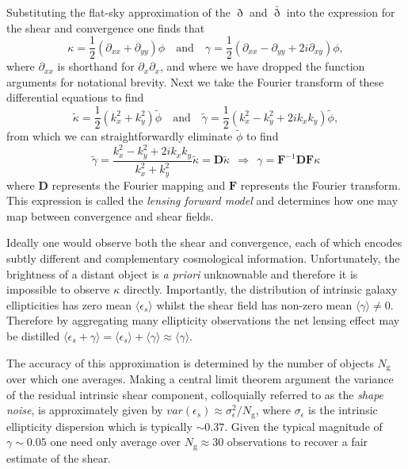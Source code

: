 \documentclass[fleqn,usenatbib]{mnras}
\begin{document}
Substituting the flat-sky approximation of the $\eth$ and $\bar{\eth}$ into the expression for the shear and convergence one finds that 
\begin{equation}
	\kappa = \frac{1}{2}(\partial_{xx}+\partial_{yy}) \phi
	\quad \text{and} \quad 
	\gamma = \frac{1}{2}(\partial_{xx}-\partial_{yy}+2i\partial_{xy})\phi,
\end{equation}
where $\partial_{xx}$ is shorthand for $\partial_x\partial_x$, and where we have dropped the function arguments for notational brevity. Next we take the Fourier transform of these differential equations to find 
\begin{equation}
	\tilde{\kappa} = \frac{1}{2}(k_x^2+k_y^2) \tilde{\phi}
	\quad \text{and} \quad 
	\tilde{\gamma} = \frac{1}{2}(k_x^2-k_y^2+2ik_xk_y)\tilde{\phi},
\end{equation}
from which we can straightforwardly eliminate $\tilde{\phi}$ to find 
\begin{equation} \label{eq:lensing_inv_problem}
	\tilde{\gamma} = \frac{k_x^2 - k_y^2 + 2ik_xk_y}{k_x^2+k_y^2}\tilde{\kappa} = \mathbf{D}\tilde{\kappa} 
	\:\: \Rightarrow \: \:  \gamma = \mathbf{F}^{-1}\mathbf{DF}\kappa
\end{equation}
where $\mathbf{D}$ represents the Fourier mapping and $\mathbf{F}$ represents the Fourier transform. This expression is called the \emph{lensing forward model} and determines how one may map between convergence and shear fields. 

Ideally one would observe both the shear and convergence, each of which encodes subtly different and complementary cosmological information. Unfortunately, the brightness of a distant object is \emph{a priori} unknownable and therefore it is impossible to observe $\kappa$ directly. Importantly, the distribution of intrinsic galaxy ellipticities has zero mean $\langle \epsilon_s \rangle$ whilst the shear field has non-zero mean $\langle \gamma \rangle \not= 0$. Therefore by aggregating many ellipticity observations the net lensing effect may be distilled $\langle \epsilon_s + \gamma \rangle = \langle \epsilon_s \rangle + \langle \gamma \rangle \approx \langle \gamma \rangle$. 

The accuracy of this approximation is determined by the number of objects $N_\text{g}$ over which one averages. Making a central limit theorem argument the variance of the residual intrinsic shear component, colloquially referred to as the \emph{shape noise}, is approximately given by $var(\epsilon_s) \approx \sigma^2_\epsilon / N_\text{g}$, where $\sigma_\epsilon$ is the intrinsic ellipticity dispersion which is typically $\sim 0.37$. Given the typical magnitude of $\gamma \sim 0.05$ one need only average over $N_\text{g}\approx 30$ observations to recover a fair estimate of the shear. 
\end{document}
